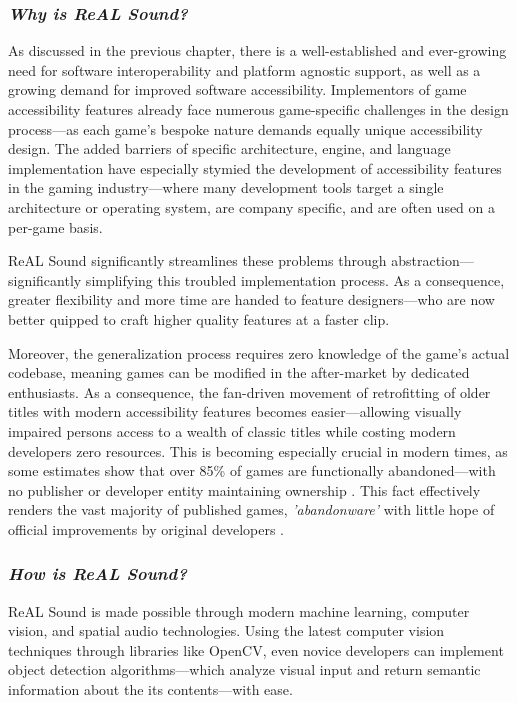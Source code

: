\documentclass{report}
\newcommand{\rs}{ReAL Sound\xspace}
\begin{document}
\subsubsection{\emph{Why is \rs?}}
As discussed in the previous chapter, there is a well-established and ever-growing need for software interoperability and platform agnostic support, as well as a growing demand for improved software accessibility. Implementors of game accessibility features already face numerous game-specific challenges in the design process---as each game's bespoke nature demands equally unique accessibility design. The added barriers of specific architecture, engine, and language implementation have especially stymied the development of accessibility features in the gaming industry---where many development tools target a single architecture or operating system, are company specific, and are often used on a per-game basis. 

\rs significantly streamlines these problems through abstraction---significantly simplifying this troubled implementation process. As a consequence, greater flexibility and more time are handed to feature designers---who are now better quipped to craft higher quality features at a faster clip.

Moreover, the generalization process requires zero knowledge of the game's actual codebase, meaning games can be modified in the after-market by dedicated enthusiasts. As a consequence, the fan-driven movement of retrofitting of older titles with modern accessibility features becomes easier---allowing visually impaired persons access to a wealth of classic titles while costing modern developers zero resources. This is becoming especially crucial in modern times, as some estimates show that over 85\% of games are functionally abandoned---with no publisher or developer entity maintaining ownership \cite{Lewin_2023}. This fact effectively renders the vast majority of published games, \emph{'abandonware'} with little hope of official improvements by original developers \cite{Costikyan_2000}.

\subsubsection{\emph{How is \rs?}}
\rs is made possible through modern machine learning, computer vision, and spatial audio technologies. Using the latest computer vision techniques through libraries like OpenCV\cite{opencv_library}, even novice developers can implement object detection algorithms---which analyze visual input and return semantic information about the its contents---with ease. 
\end{document}
